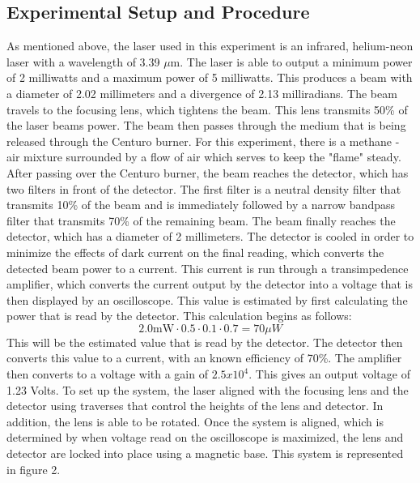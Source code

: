 \documentclass{article}
\begin{document}
\begin{center}
    \subsection*{Experimental Setup and Procedure}
\end{center}
$$$$
\indent As mentioned above, the laser used in this experiment is an infrared, helium-neon laser with a wavelength of 3.39 $\mu$m.  The laser is able to output a minimum power of 2 milliwatts and a maximum power of 5 milliwatts.  This produces a beam with a diameter of 2.02 millimeters and a divergence of 2.13 milliradians.  The beam travels to the focusing lens, which tightens the beam.  This lens transmits 50\% of the laser beams power.  The beam then passes through the medium that is being released through the Centuro burner.  For this experiment, there is a methane - air mixture surrounded by a flow of air which serves to keep the "flame" steady. \newline 
\indent After passing over the Centuro burner, the beam reaches the detector, which has two filters in front of the detector.  The first filter is a neutral density filter that transmits 10\% of the beam and is immediately followed by a narrow bandpass filter that transmits 70\% of the remaining beam.  The beam finally reaches the detector, which has a diameter of 2 millimeters. The detector is cooled in order to minimize the effects of dark current on the final reading, which converts the detected beam power to a current. \newline
\indent This current is run through a transimpedence amplifier, which converts the current output by the detector into a voltage that is then displayed by an oscilloscope. This value is estimated by first calculating the power that is read by the detector.  This calculation begins as follows:
$$2.0\textrm{mW}\cdot0.5\cdot0.1\cdot0.7=70\mu W$$
This will be the estimated value that is read by the detector.  The detector then converts this value to a current, with an known efficiency of 70\%.  The amplifier then converts to a voltage with a gain of $2.5x10^4$.  This gives an output voltage of 1.23 Volts.\newline
\indent To set up the system, the laser aligned with the focusing lens and the detector using traverses that control the heights of the lens and detector. In addition, the lens is able to be rotated.  Once the system is aligned, which is determined by when voltage read on the oscilloscope is maximized, the lens and detector are locked into place using a magnetic base.  This system is represented in figure 2. \newline
\end{document}
